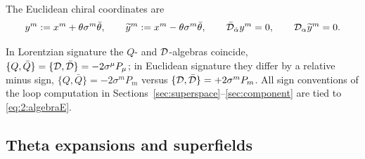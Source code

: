 The Euclidean chiral coordinates are
\begin{equation}
y^m:=x^m+\theta\sigma^m\bar\theta,\qquad
\widetilde y^m:=x^m-\theta\sigma^m\bar\theta,\qquad
\bar{\mathcal{D}}_{\dot\alpha}y^m=0,\qquad
\mathcal{D}_\alpha\widetilde y^m=0 .
\label{eq:2:ychiralE}
\end{equation}
\begin{remark}\label{rem:2:signtrap}
In Lorentzian signature the $Q$- and $\mathcal{D}$-algebras coincide,
$\{Q,\bar Q\}=\{\mathcal{D},\bar{\mathcal{D}}\}=-2\sigma^\mu P_\mu$; in Euclidean signature they
differ by a relative minus sign, $\{Q,\bar Q\}=-2\sigma^m P_m$ versus
$\{\mathcal{D},\bar{\mathcal{D}}\}=+2\sigma^m P_m$. All sign conventions of the loop computation in
Sections~\ref{sec:superspace}--\ref{sec:component} are tied to
\eqref{eq:2:algebraE}.
\end{remark}

\subsection{Theta expansions and superfields}\label{sec:notation:superfields}


